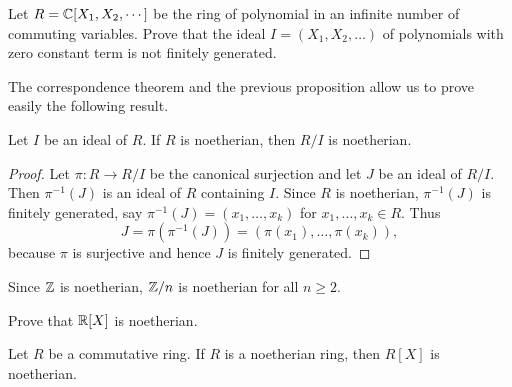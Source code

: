 \begin{exercise}
	Let $R=\mathbb{C}[X_1,X_2,\cdots]$ be the ring of polynomial in an infinite number of 
	commuting variables. Prove that the ideal $I=(X_1,X_2,\dots)$ of polynomials 
	with zero constant term is not finitely generated. 
\end{exercise}

The correspondence theorem and the previous proposition 
allow us to prove easily the following result. 

\begin{proposition}
	Let $I$ be an ideal of $R$. If $R$ is noetherian, then $R/I$ is noetherian.
\end{proposition}

\begin{proof}
	Let $\pi\colon R\to R/I$ be the canonical surjection and let $J$ be an ideal of $R/I$. 
	Then $\pi^{-1}(J)$ is an ideal of $R$ containing $I$. Since 
	$R$ is noetherian, $\pi^{-1}(J)$ is finitely generated, say 
	$\pi^{-1}(J)=(x_1,\dots,x_k)$ for $x_1,\dots,x_k\in R$. Thus 
	\[
	J=\pi(\pi^{-1}(J))=(\pi(x_1),\dots,\pi(x_k)),
	\]
	because $\pi$ is surjective 
	and hence $J$ is finitely generated. 
\end{proof}

Since $\mathbb{Z}$ is noetherian, $\mathbb{Z}/n$ is noetherian for all $n\geq2$. 

\begin{exercise}
	Prove that $\mathbb{R}[X]$ is noetherian. 	
\end{exercise}


\begin{theorem}[Hilbert]
	Let $R$ be a commutative ring. If $R$ is a noetherian ring, then $R[X]$ is noetherian.	
\end{theorem}

